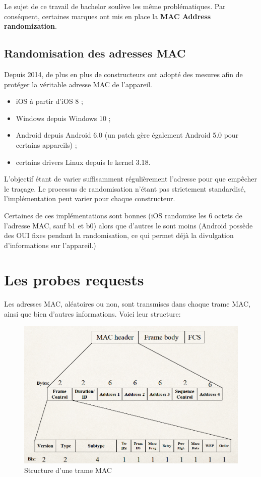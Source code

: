 Le sujet de ce travail de bachelor soulève les même problématiques. Par conséquent, certaines marques
ont mis en place la \textbf{MAC Address randomization}.

\subsection{Randomisation des adresses MAC~\cite{connected:macrandom}}

Depuis 2014, de plus en plus de constructeurs ont adopté des mesures
afin de protéger la véritable adresse MAC de l'appareil. 

\begin{itemize}
    \item iOS à partir d’iOS 8 ;
    \item Windows depuis Windows 10 ;
    \item Android depuis Android 6.0 (un patch gère également Android 5.0 pour certains appareils) ;
    \item certains drivers Linux depuis le kernel 3.18.
\end{itemize}

L'objectif étant de varier suffisamment régulièrement l'adresse pour que empêcher le traçage. 
Le processus de randomisation n'étant pas strictement standardisé, l'implémentation peut varier pour chaque constructeur. 

Certaines de ces implémentations sont bonnes (iOS randomise les 6 octets de l'adresse MAC, sauf b1 et b0) alors que d'autres le sont moins (Android possède des OUI fixes pendant la randomisation, ce qui 
permet déjà la divulgation d'informations sur l'appareil.)

\section{Les probes requests}

Les adresses MAC, aléatoires ou non, sont transmises dans chaque trame MAC, ainsi que bien d'autres
informations. Voici leur structure:

\begin{figure}[H]
	\centering
	\includegraphics[width=14cm]{images/probe/mac_frame.png}
	\caption{Structure d'une trame MAC}
	\label{fig:macframe}
\end{figure}


